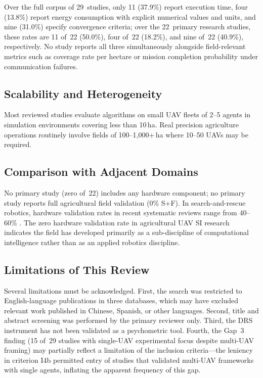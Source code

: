 \documentclass[review,3p]{elsarticle}
\begin{document}
Over the full corpus of 29~studies, only 11 (37.9\%) report execution time,
four (13.8\%) report energy consumption with explicit numerical values and units,
and nine (31.0\%) specify convergence criteria; over the 22~primary research
studies, these rates are 11 of~22 (50.0\%), four of~22 (18.2\%), and nine of~22
(40.9\%), respectively. No study reports all three simultaneously alongside
field-relevant metrics such as coverage rate per hectare or mission completion
probability under communication failures.

\subsection{Scalability and Heterogeneity}

Most reviewed studies evaluate algorithms on small UAV fleets of 2--5 agents in
simulation environments covering less than 10\,ha. Real precision agriculture
operations routinely involve fields of 100--1,000+\,ha where 10--50 UAVs may be
required.

\subsection{Comparison with Adjacent Domains}
\label{sec:comparison}

No primary study (zero of~22) includes any hardware component; no primary study
reports full agricultural field validation (0\% S+F). In search-and-rescue
robotics, hardware validation rates in recent systematic reviews range from
40--60\% \cite{chung2018}. The zero hardware validation rate in agricultural
UAV SI research indicates the field has developed primarily as a sub-discipline
of computational intelligence rather than as an applied robotics discipline.

\subsection{Limitations of This Review}
\label{sec:limitations_discussion}

Several limitations must be acknowledged. First, the search was restricted to
English-language publications in three databases, which may have excluded
relevant work published in Chinese, Spanish, or other languages. Second,
title and abstract screening was performed by the primary reviewer only.
Third, the DRS instrument has not been validated as a psychometric tool.
Fourth, the Gap~3 finding (15 of~29 studies with single-UAV experimental
focus despite multi-UAV framing) may partially reflect a limitation of the
inclusion criteria---the leniency in criterion I4b permitted entry of studies
that validated multi-UAV frameworks with single agents, inflating the apparent
frequency of this gap.
\end{document}
